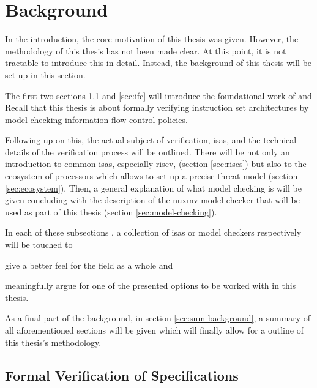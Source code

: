 
\section{Background}
\label{sec:background}

In the introduction, the core motivation of this thesis was given.
However, the methodology of this thesis has not been made clear.
At this point, it is not tractable to introduce this in detail.
Instead, the background of this thesis will be set up in this section.

The first two sections \ref{sec:verify-spec} and \ref{sec:ifc} will introduce the foundational work of \citeauthor{Reid17} \cite{Reid17} and \citeauthor{Ferraiuolo17} \cite{Ferraiuolo17}
Recall that this thesis is about formally verifying instruction set architectures by model checking information flow control policies.

Following up on this, the actual subject of verification, \glspl{isa}, and the technical details of the verification process will be outlined.
There will be not only an introduction to common \glspl{isa}, especially \gls{riscv}, (section \ref{sec:riscs}) but also to the ecosystem of processors which allows to set up a precise threat-model (section \ref{sec:ecosystem}).
Then, a general explanation of what model checking is will be given concluding with the description of the \gls{nuxmv} model checker that will be used as part of this thesis (section \ref{sec:model-checking}).

In each of these subsections , a collection of \glspl{isa} or model checkers respectively will be touched to \begin{enumerate*}[label=\alph*)]
    \item give a better feel for the field as a whole and
    \item meaningfully argue for one of the presented options to be worked with in this thesis.
\end{enumerate*}

As a final part of the background, in section \ref{sec:sum-background}, a summary of all aforementioned sections will be given which will finally allow for a outline of this thesis's methodology.

\subsection{Formal Verification of Specifications}
\label{sec:verify-spec}

